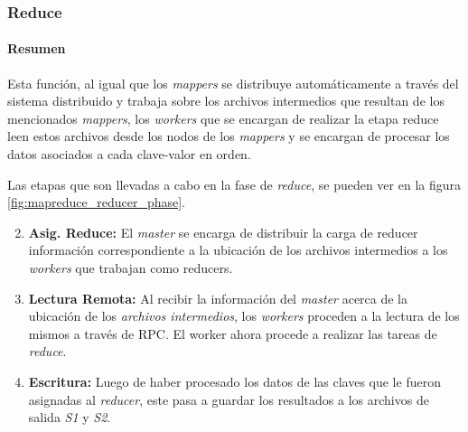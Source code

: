 \subsubsection{Reduce}
\label{sssec:reduce}

\paragraph{Resumen} Esta función, al igual que los {\it mappers} se distribuye
automáticamente a través del sistema distribuido y trabaja sobre los archivos
intermedios que resultan de los mencionados {\it mappers}, los {\it workers}
que se encargan de realizar la etapa {reduce} leen estos archivos desde los
nodos de los {\it mappers} y se encargan de procesar los datos asociados a cada
clave-valor en orden.

Las etapas que son llevadas a cabo en la fase de {\it reduce}, se pueden ver en
la figura \ref{fig:mapreduce_reducer_phase}.


\begin{enumerate}
\setcounter{enumi}{1}
\item {\bf Asig. Reduce:} El {\it master} se encarga de distribuir la carga de
      reducer información correspondiente a la ubicación de los archivos 
      intermedios a los {\it workers} que trabajan como reducers.
\setcounter{enumi}{4}
\item {\bf Lectura Remota:} Al recibir la información del {\it master} acerca
      de la ubicación de los {\it archivos intermedios}, los {\it workers}
      proceden a la lectura de los mismos a través de RPC. El worker ahora
      procede a realizar las tareas de {\it reduce}.
\item {\bf Escritura:} Luego de haber procesado los datos de las claves que le
      fueron asignadas al {\it reducer}, este pasa a guardar los resultados a
      los archivos de salida {\it S1} y {\it S2}.
\end{enumerate}


